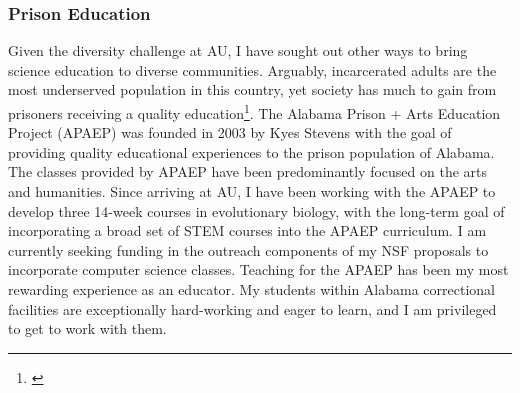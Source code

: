 \subsubsection*{Prison Education}
Given the diversity challenge at AU,
I have sought out other ways to bring science education to diverse communities.
Arguably, incarcerated adults are the most underserved population in this country,
yet society has much to gain from prisoners receiving a quality
education\footnote{\label{Vacca04}}.
The Alabama Prison + Arts Education Project (APAEP) was founded in 2003 by Kyes
Stevens with the goal of providing quality
educational experiences to the prison population of Alabama.
The classes provided by APAEP have been predominantly focused on the
arts and humanities.
Since arriving at AU, I have been working with the APAEP to develop three
14-week courses in evolutionary biology, with the long-term goal of
incorporating a broad set of STEM courses into the APAEP curriculum.
I am currently seeking funding in the outreach components of my NSF proposals
to incorporate computer science classes.
Teaching for the APAEP has been my most rewarding experience as an educator.
My students within Alabama correctional facilities are exceptionally
hard-working and eager to learn, and I am privileged to get to work with them.
